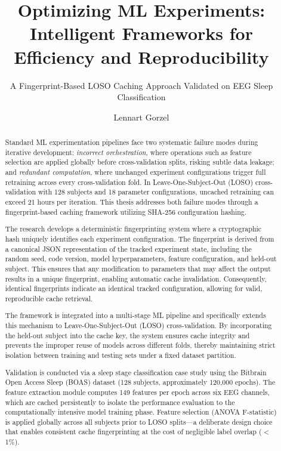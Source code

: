 \documentclass{imc-inf}
\title{Optimizing ML Experiments: Intelligent Frameworks for Efficiency and Reproducibility}
\subtitle{A Fingerprint-Based LOSO Caching Approach Validated on EEG Sleep Classification}
\author{Lennart Gorzel}
\begin{document}
\frontmatter
\maketitle

\begin{declarations}
\end{declarations}


\begin{abstract}
Standard ML experimentation pipelines face two systematic failure modes during iterative development: \textit{incorrect orchestration}, where operations such as feature selection are applied globally before cross-validation splits, risking subtle data leakage; and \textit{redundant computation}, where unchanged experiment configurations trigger full retraining across every cross-validation fold. In Leave-One-Subject-Out (LOSO) cross-validation with 128 subjects and 18 parameter configurations, uncached retraining can exceed 21 hours per iteration. This thesis addresses both failure modes through a fingerprint-based caching framework utilizing SHA-256 configuration hashing.

The research develops a deterministic fingerprinting system where a cryptographic hash uniquely identifies each experiment configuration. The fingerprint is derived from a canonical JSON representation of the tracked experiment state, including the random seed, code version, model hyperparameters, feature configuration, and held-out subject. This ensures that any modification to parameters that may affect the output results in a unique fingerprint, enabling automatic cache invalidation. Consequently, identical fingerprints indicate an identical tracked configuration, allowing for valid, reproducible cache retrieval.

The framework is integrated into a multi-stage ML pipeline and specifically extends this mechanism to Leave-One-Subject-Out (LOSO) cross-validation. By incorporating the held-out subject into the cache key, the system ensures cache integrity and prevents the improper reuse of models across different folds, thereby maintaining strict isolation between training and testing sets under a fixed dataset partition.

Validation is conducted via a sleep stage classification case study using the Bitbrain Open Access Sleep (BOAS) dataset (128 subjects, approximately 120,000 epochs). The feature extraction module computes 149 features per epoch across six EEG channels, which are cached persistently to isolate the performance evaluation to the computationally intensive model training phase. Feature selection (ANOVA F-statistic) is applied globally across all subjects prior to LOSO splits---a deliberate design choice that enables consistent cache fingerprinting at the cost of negligible label overlap ($<$1\%).


\end{abstract}
\end{document}
